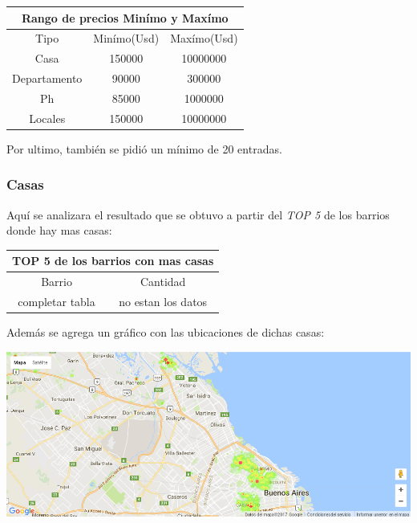 \documentclass[a4paper, 10pt]{article}
\begin{document}
				\begin{center}
						\begin{tabular}{ |c|c|c| }
							\hline
							\multicolumn{3}{|c|}{Rango de precios Minímo y Maxímo}\\
							\hline
							\hline
							Tipo & Minímo(Usd) & Maxímo(Usd)\\
							\hline
							Casa & 150000 & 10000000\\
							Departamento & 90000 &300000\\
							Ph & 85000 & 1000000\\
							Locales & 150000 & 10000000\\
							\hline
						\end{tabular}
					\end{center}
				Por ultimo, también se pidió un mínimo de 20 entradas.	
			
				\subsubsection{Casas}
				
				Aquí se analizara el resultado que se obtuvo a partir del \emph{TOP 5} de los barrios donde hay mas casas:
				
				\begin{center}
						\begin{tabular}{ |c|c| }
							\hline
							\multicolumn{2}{|c|}{TOP 5 de los barrios con mas casas}\\
							\hline
							\hline
							Barrio & Cantidad\\
							\hline
							completar tabla & no estan los datos\\
							\hline
						\end{tabular}
					\end{center}
				
				Además se agrega un gráfico con las ubicaciones de dichas casas:
				
				\begin{center}
   		    				\includegraphics[width=\textwidth]{images/ubicMasCasas}
				\end{center}
				
\end{document}
